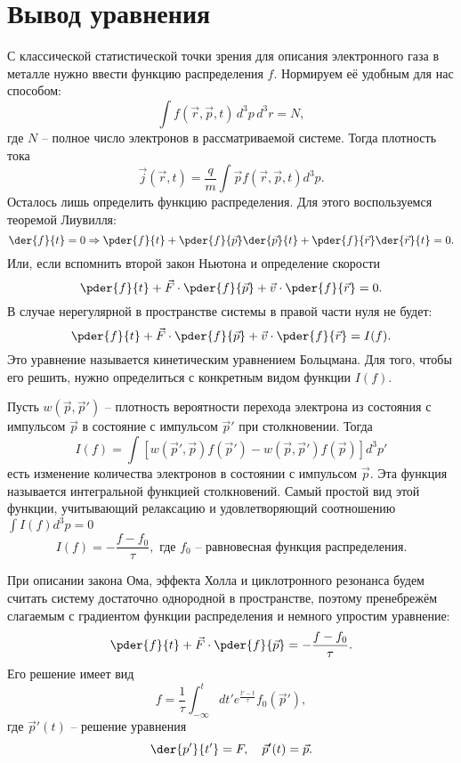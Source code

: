 \section{Вывод уравнения}

С классической статистической точки зрения для описания электронного газа в
металле нужно ввести функцию распределения \( f \). Нормируем её удобным для
нас способом:
\[
    \int f(\vec{r},\vec{p},t)\,d^3p\,d^3r = N,
\]
где \( N \) -- полное число электронов в рассматриваемой системе. Тогда
плотность тока
\[
    \vec{j}(\vec{r},t) = \frac{q}{m} \int \vec{p} f(\vec{r},\vec{p},t) d^3p.
\]
Осталось лишь определить функцию распределения. Для этого воспользуемся теоремой
Лиувилля:
\[
    \der{f}{t} = 0 \Rightarrow
    \pder{f}{t} + \pder{f}{\vec{p}}\der{\vec{p}}{t} +
    \pder{f}{\vec{r}}\der{\vec{r}}{t} = 0.
\]
Или, если вспомнить второй закон Ньютона и определение скорости
\[
    \pder{f}{t} + \vec{F}\cdot\pder{f}{\vec{p}} + \vec{v}\cdot\pder{f}{\vec{r}}
    = 0.
\]
В случае нерегулярной в пространстве системы в правой части нуля не будет:
\[
    \pder{f}{t} + \vec{F}\cdot\pder{f}{\vec{p}} + \vec{v}\cdot\pder{f}{\vec{r}}
    = I(f).
\]
Это уравнение называется кинетическим уравнением Больцмана. Для того, чтобы его
решить, нужно определиться с конкретным видом функции \( I(f) \).

Пусть \( w(\vec{p},\vec{p}') \) -- плотность вероятности перехода электрона из
состояния с импульсом \( \vec{p} \) в состояние с импульсом \( \vec{p}' \) при
столкновении. Тогда
\[
    I(f) =
        \int [w(\vec{p}',\vec{p})f(\vec{p}')-w(\vec{p},\vec{p}')f(\vec{p})]d^3p'
\]
есть изменение количества электронов в состоянии с импульсом \( \vec{p} \). Эта
функция называется интегральной функцией столкновений. Самый простой вид этой
функции, учитывающий релаксацию и удовлетворяющий соотношению
\( \int I(f) d^3p = 0 \)
\[
    I(f) = -\frac{f - f_0}{\tau},\text{ где } f_0
    \text{ -- равновесная функция распределения.}
\]

При описании закона Ома, эффекта Холла и циклотронного резонанса будем считать
систему достаточно однородной в пространстве, поэтому пренебрежём слагаемым с
градиентом функции распределения и немного упростим уравнение:
\[
    \pder{f}{t} + \vec{F}\cdot\pder{f}{\vec{p}} = -\frac{f-f_0}{\tau}.
\]
Его решение имеет вид
\[
    f = \frac{1}{\tau}\int_{-\infty}^t dt' e^\frac{t'-t}{\tau} f_0(\vec{p}'),
\]
где \( \vec{p}'(t) \) -- решение уравнения
\[
    \der{p'}{t'} = F, \quad \vec{p}'(t) = \vec{p}.
\]

